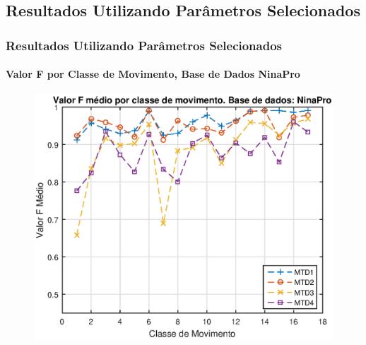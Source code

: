 \documentclass{beamer}
\begin{document}
	\subsection[Resultados Utilizando Parâmetros Selecionados]{Resultados Utilizando Parâmetros Selecionados}
	
	\begin{frame}
		\frametitle{Resultados Utilizando Parâmetros Selecionados}
		\framesubtitle{Valor F por Classe de Movimento, Base de Dados NinaPro}
		
		\begin{figure}
			\begin{center}
				\includegraphics[width=\textwidth]{./img/fvalue_nina.eps}
			\end{center}
		\end{figure}
		
	\end{frame}
	
\end{document}
